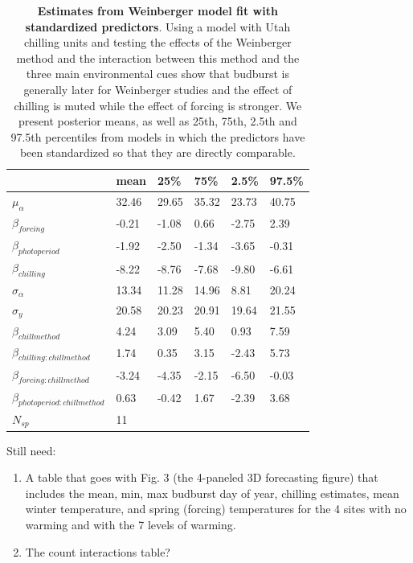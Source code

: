 \documentclass{article}
\begin{document}
\begin{footnotesize}
\begin{table}[ht]
\centering
\caption{\textbf{Estimates from Weinberger model fit with standardized predictors}. Using a model with Utah chilling units and testing the effects of the Weinberger method and the interaction between this method and the three main environmental cues  show that budburst is generally later for Weinberger studies and the effect of chilling is muted while the effect of forcing is stronger. We present posterior means, as well as 25th, 75th, 2.5th and 97.5th percentiles from models in which the predictors have been standardized so that they are directly comparable.} 
\label{tab:methods}
\begingroup\footnotesize
\begin{tabular}{|p{}|p{}|p{}|p{}|p{}|p{}|}
  \hline
 & mean & 25\% & 75\% & 2.5\% & 97.5\% \\ 
  \hline
$\mu_{\alpha}$ & 32.46 & 29.65 & 35.32 & 23.73 & 40.75 \\ 
  $\beta_{forcing}$ & -0.21 & -1.08 & 0.66 & -2.75 & 2.39 \\ 
  $\beta_{photoperiod}$ & -1.92 & -2.50 & -1.34 & -3.65 & -0.31 \\ 
  $\beta_{chilling}$ & -8.22 & -8.76 & -7.68 & -9.80 & -6.61 \\ 
  $\sigma_{\alpha}$ & 13.34 & 11.28 & 14.96 & 8.81 & 20.24 \\ 
  $\sigma_{y}$ & 20.58 & 20.23 & 20.91 & 19.64 & 21.55 \\ 
  $\beta_{chillmethod}$ & 4.24 & 3.09 & 5.40 & 0.93 & 7.59 \\ 
  $\beta_{chilling : chillmethod}$ & 1.74 & 0.35 & 3.15 & -2.43 & 5.73 \\ 
  $\beta_{forcing : chillmethod}$ & -3.24 & -4.35 & -2.15 & -6.50 & -0.03 \\ 
  $\beta_{photoperiod : chillmethod}$ & 0.63 & -0.42 & 1.67 & -2.39 & 3.68 \\ 
   \hline
$N_{sp}$ & 11 &  &  &  &  \\ 
   \hline
\end{tabular}
\endgroup
\end{table}\end{footnotesize} 

Still need: 
\begin{enumerate}

\item A table that goes with Fig. 3 (the 4-paneled 3D forecasting figure) that includes the mean, min, max budburst day of year, chilling estimates, mean winter temperature, and spring (forcing) temperatures for the 4 sites with no warming and with the 7 levels of warming.
\item The count interactions table?
% 
\end{enumerate}
\end{document}

